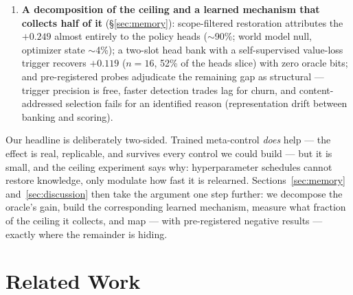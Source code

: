 \documentclass[11pt]{article}
\begin{document}
\begin{enumerate}
  this benchmark, contradicting a weak-baseline artifact in an earlier report
  on this system; the honest trained-controller increment is an order of
  magnitude smaller than initially reported.
  \item \textbf{A decomposition of the ceiling and a learned mechanism that
  collects half of it} (\S\ref{sec:memory}): scope-filtered restoration
  attributes the $+0.249$ almost entirely to the policy heads ($\sim$90\%;
  world model null, optimizer state $\sim$4\%); a two-slot head bank with a
  self-supervised value-loss trigger recovers $+0.119$ ($n{=}16$, 52\% of the
  heads slice) with zero oracle bits; and pre-registered probes adjudicate the
  remaining gap as structural --- trigger precision is free, faster detection
  trades lag for churn, and content-addressed selection fails for an
  identified reason (representation drift between banking and scoring).
\end{enumerate}

Our headline is deliberately two-sided. Trained meta-control \emph{does} help
--- the effect is real, replicable, and survives every control we could build
--- but it is small, and the ceiling experiment says why: hyperparameter
schedules cannot restore knowledge, only modulate how fast it is relearned.
Sections~\ref{sec:memory} and~\ref{sec:discussion} then take the argument one
step further: we decompose the oracle's gain, build the corresponding learned
mechanism, measure what fraction of the ceiling it collects, and map --- with
pre-registered negative results --- exactly where the remainder is hiding.

\section{Related Work}
\label{sec:related}
\end{document}
